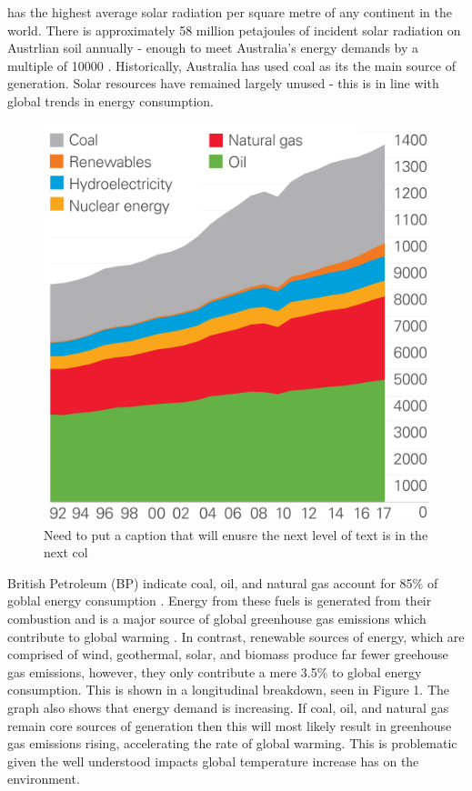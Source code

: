 \documentclass[10pt,journal,compsoc]{IEEEtran}
\begin{document}
		 has the highest average solar radiation per square metre of any continent in the world. There is approximately 58 million petajoules of incident solar radiation on Austrlian soil annually - enough to meet Australia's energy demands by a multiple of 10000 \cite{Australia:2014}. Historically, Australia has used coal as its the main source of generation. Solar resources have remained largely unused - this is in line with global trends in energy consumption.
		\begin{figure}[h]
			\centering
			\includegraphics[scale=0.1]{globa_energy}
			\caption{Need to put a caption that will enusre the next level of text is in the next col}
		\end{figure}
		
		British Petroleum (BP) indicate coal, oil, and natural gas account for 85\% of goblal energy consumption \cite{BP:201806}. Energy from these fuels is generated from their combustion and is a major source of global greenhouse gas emissions which contribute to global warming \cite{Azapagic:2011}. In contrast, renewable sources of energy, which are comprised of wind, geothermal, solar, and biomass produce far fewer greehouse gas emissions, however, they only contribute a mere 3.5\% to global energy consumption. This is shown in a longitudinal breakdown, seen in Figure 1. The graph also shows that energy demand is increasing. If coal, oil, and natural gas remain core sources of generation then this will most likely result in greenhouse gas emissions rising, accelerating the rate of global warming. This is problematic given the well understood impacts global temperature increase has on the environment.\\
		
\end{document}

